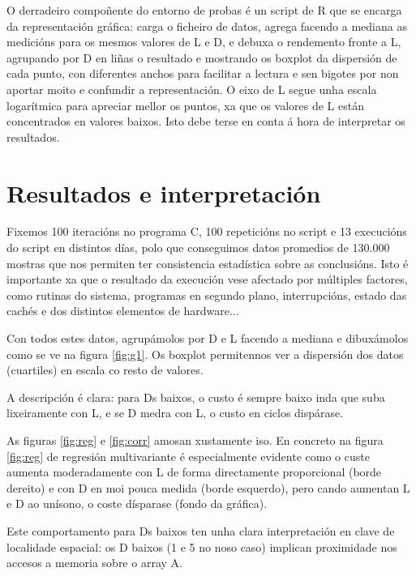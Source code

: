 \documentclass[letterpaper, 10 pt,spanish, conference]{ieeeconf}  %
\begin{document}
    O derradeiro compoñente do entorno de probas é un script de R que se encarga da representación gráfica: carga o ficheiro de datos, agrega facendo a mediana as medicións para os mesmos valores de L e D, e debuxa o rendemento fronte a L, agrupando por D en liñas o resultado e mostrando os boxplot da dispersión de cada punto, con diferentes anchos para facilitar a lectura e sen bigotes por non aportar moito e confundir a representación. O eixo de L segue unha escala logarítmica para apreciar mellor os puntos, xa que os valores de L están concentrados en valores baixos. Isto debe terse en conta á hora de interpretar os resultados.

\section{Resultados e interpretación}

Fixemos 100 iteracións no programa C, 100 repeticións no script e 13 execucións do script en distintos días, polo que conseguimos datos promedios de 130.000 mostras que nos permiten ter consistencia estadística sobre as conclusións. Isto é importante xa que o resultado da execución vese afectado por múltiples factores, como rutinas do sistema, programas en segundo plano, interrupcións, estado das cachés e dos distintos elementos de hardware... 

Con todos estes datos, agrupámolos por D e L facendo a mediana e dibuxámolos como se ve na figura \ref{fig:g1}. Os boxplot permitennos ver a dispersión dos datos (cuartiles) en escala co resto de valores.

A descripción é clara: para Ds baixos, o custo é sempre baixo inda que suba lixeiramente con L, e se D medra con L, o custo en ciclos dispárase.

As figuras \ref{fig:reg} e \ref{fig:corr} amosan xustamente iso. En concreto na figura \ref{fig:reg} de regresión multivariante é especialmente evidente como o custe aumenta moderadamente con L de forma directamente proporcional (borde dereito) e con D en moi pouca medida (borde esquerdo), pero cando aumentan L e D ao unísono, o coste dísparase (fondo da gráfica).

Este comportamento para Ds baixos ten unha clara interpretación en clave de localidade espacial: os D baixos (1 e 5 no noso caso) implican proximidade nos accesos a memoria sobre o array A. 
\end{document}
